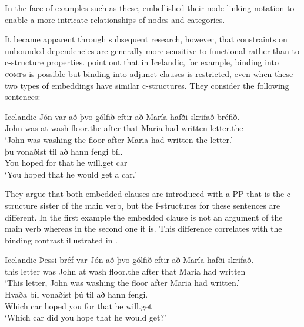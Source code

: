 \documentclass[output=paper,hidelinks]{langscibook}
\begin{document}
\ea \label{mismatch}
        \begin{xlist}
            \label{mismatchc}
            \label{mismatchd}
        \end{xlist}
\z

\noindent In the face of examples such as these, \citet{kaplanbresnan82} embellished their node-linking notation to enable a more intricate relationships of nodes and categories. 

It became apparent through subsequent research, however, that constraints on unbounded dependencies are generally more sensitive to functional rather than to c-structure properties. \citet{kaplzaen89} point out that in Icelandic, for example, binding into \textsc{comp}s is possible but binding into adjunct clauses is restricted, even when these two types of embeddings have similar c-structures. They consider the following sentences: 

\ea\label{icegood}Icelandic
\ea\label{iceadj}
\gll Jón var að þvo g\'olfið eftir að María hafði skrifað br\'efið.\\  
     John was at wash floor.the after that Maria had written letter.the\\
\glt `John was washing the floor after Maria had written the letter.'\\[1em]

\ex\label{icecomp}
\gll þu vonaðist til að hann fengi b\'il. \\  
     You hoped for that he will.get car\\
\glt `You hoped that he would get a car.'\\
\z\z

\noindent They argue that both embedded clauses are introduced with a PP that is the c-structure sister of the main verb, but the f-structures for these sentences are different. In the first example the embedded clause is not an argument of the main verb whereas in the second one it is.  This difference correlates with the binding contrast illustrated in .

\ea\label{icecontrast}Icelandic
\ea \label{iceadj2}
\gll *\hsp{.05em}Þessi bréf var Jón að þvo g\'olfið eftir að María hafði skrifað.\\  
     \phantom{*\hsp{.05em}}this letter was John at wash floor.the after that Maria had written\\
\glt `This letter, John was washing the floor after Maria had written.'\\[1em]
\ex\label{icecomp2}
\gll Hvaða bíl vonaðist þ\'u til að hann fengi. \\  
     Which car hoped you for that he will.get\\
\glt `Which car did you hope that he would get?'\\
\z\z
\end{document}
